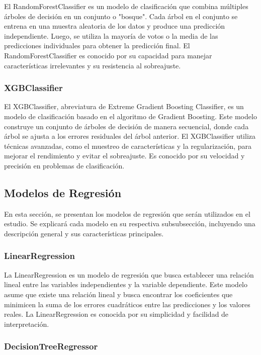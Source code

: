 El RandomForestClassifier es un modelo de clasificación que combina múltiples árboles de decisión en un conjunto o "bosque". Cada árbol en el conjunto se entrena en una muestra aleatoria de los datos y produce una predicción independiente. Luego, se utiliza la mayoría de votos o la media de las predicciones individuales para obtener la predicción final. El RandomForestClassifier es conocido por su capacidad para manejar características irrelevantes y su resistencia al sobreajuste.

\subsubsection{XGBClassifier}

El XGBClassifier, abreviatura de Extreme Gradient Boosting Classifier, es un modelo de clasificación basado en el algoritmo de Gradient Boosting. Este modelo construye un conjunto de árboles de decisión de manera secuencial, donde cada árbol se ajusta a los errores residuales del árbol anterior. El XGBClassifier utiliza técnicas avanzadas, como el muestreo de características y la regularización, para mejorar el rendimiento y evitar el sobreajuste. Es conocido por su velocidad y precisión en problemas de clasificación.

\subsection{Modelos de Regresión}

En esta sección, se presentan los modelos de regresión que serán utilizados en el estudio. Se explicará cada modelo en su respectiva subsubsección, incluyendo una descripción general y sus características principales.

\subsubsection{LinearRegression}

La LinearRegression es un modelo de regresión que busca establecer una relación lineal entre las variables independientes y la variable dependiente. Este modelo asume que existe una relación lineal y busca encontrar los coeficientes que minimicen la suma de los errores cuadráticos entre las predicciones y los valores reales. La LinearRegression es conocida por su simplicidad y facilidad de interpretación.

\subsubsection{DecisionTreeRegressor}

